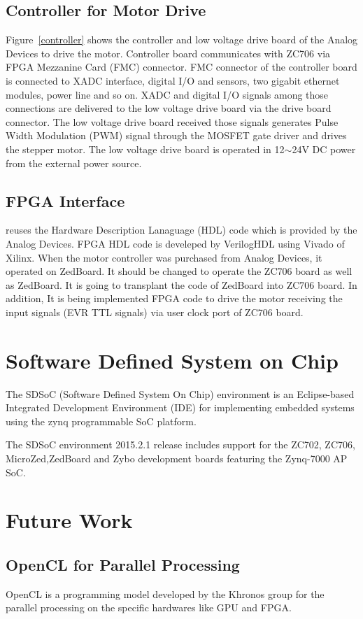 \documentclass[journal]{IEEEtran}
\begin{document}
\subsection{Controller for Motor Drive}
Figure~\ref{controller} shows the controller and low voltage drive board of the Analog Devices to drive the motor. Controller board communicates with ZC706 via FPGA Mezzanine Card (FMC) connector. FMC connector of the controller board is connected to XADC interface, digital I/O and sensors, two gigabit ethernet modules, power line and so on. XADC and digital I/O signals among those connections are delivered to the low voltage drive board via the drive board connector. The low voltage drive board received those signals generates Pulse Width Modulation (PWM) signal through the MOSFET gate driver and drives the stepper motor. The low voltage drive board is operated in 12${\sim}$24V DC power from the external power source.
\subsection{FPGA Interface}
reuses the Hardware Description Lanaguage (HDL) code which is provided by the Analog Devices. FPGA HDL code is develeped by VerilogHDL using Vivado of Xilinx. When the motor controller was purchased from Analog Devices, it operated on ZedBoard. It should be changed to operate the ZC706 board as well as ZedBoard. It is going to transplant the code of ZedBoard into ZC706 board. In addition, It is being implemented FPGA code to drive the motor receiving the input signals (EVR TTL signals) via user clock port of ZC706 board.


\section{Software Defined System on Chip}
The SDSoC (Software Defined System On Chip) environment is an Eclipse-based Integrated Development Environment (IDE) for implementing  embedded systems using the zynq programmable SoC platform.

The SDSoC environment 2015.2.1 release includes support for the ZC702, ZC706, MicroZed,ZedBoard and Zybo development boards featuring the Zynq-7000 AP SoC.
\clearpage

\section{Future Work}
\subsection{OpenCL for Parallel Processing}
OpenCL is a programming model developed by the Khronos group for the parallel processing on the specific hardwares like GPU and FPGA.
\end{document}
